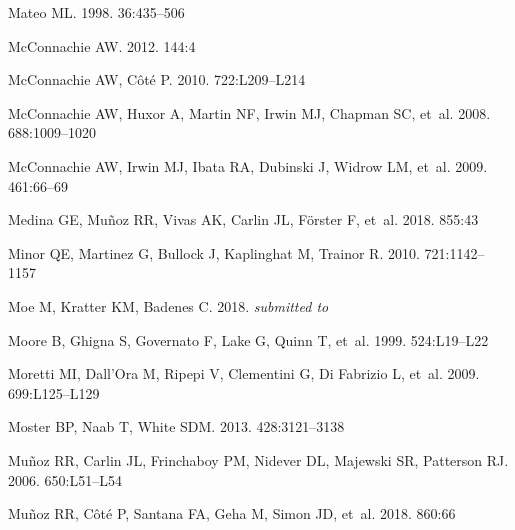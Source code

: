 \documentclass[a4paper]{ar-1col}
\begin{document}
\begin{thebibliography}{}
{Mateo} ML. 1998.
\textit{\araa} 36:435--506

{McConnachie} AW. 2012.
\textit{\aj} 144:4

{McConnachie} AW, {C{\^o}t{\'e}} P. 2010.
\textit{\apjl} 722:L209--L214

{McConnachie} AW, {Huxor} A, {Martin} NF, {Irwin} MJ, {Chapman} SC, et~al.
  2008.
\textit{\apj} 688:1009--1020

{McConnachie} AW, {Irwin} MJ, {Ibata} RA, {Dubinski} J, {Widrow} LM, et~al.
  2009.
\textit{\nat} 461:66--69

{Medina} GE, {Mu{\~n}oz} RR, {Vivas} AK, {Carlin} JL, {F{\"o}rster} F, et~al.
  2018.
\textit{\apj} 855:43

{Minor} QE, {Martinez} G, {Bullock} J, {Kaplinghat} M, {Trainor} R. 2010.
\textit{\apj} 721:1142--1157

{Moe} M, {Kratter} KM, {Badenes} C. 2018.
\textit{submitted to \apj}

{Moore} B, {Ghigna} S, {Governato} F, {Lake} G, {Quinn} T, et~al. 1999.
\textit{\apjl} 524:L19--L22

{Moretti} MI, {Dall'Ora} M, {Ripepi} V, {Clementini} G, {Di Fabrizio} L, et~al.
  2009.
\textit{\apjl} 699:L125--L129

{Moster} BP, {Naab} T, {White} SDM. 2013.
\textit{\mnras} 428:3121--3138

{Mu{\~n}oz} RR, {Carlin} JL, {Frinchaboy} PM, {Nidever} DL, {Majewski} SR,
  {Patterson} RJ. 2006.
\textit{\apjl} 650:L51--L54

{Mu{\~n}oz} RR, {C{\^o}t{\'e}} P, {Santana} FA, {Geha} M, {Simon} JD, et~al.
  2018.
\textit{\apj} 860:66


\end{thebibliography}
\end{document}
